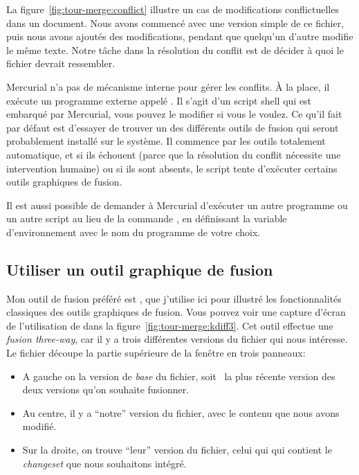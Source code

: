 La figure~\ref{fig:tour-merge:conflict} illustre un cas de modifications
conflictuelles dans un document. Nous avons commencé avec une version simple
de ce fichier, puis nous avons ajoutés des modifications, pendant que 
quelqu'un d'autre modifie le même texte. Notre tâche dans la résolution
du conflit est de décider à quoi le fichier devrait ressembler.

Mercurial n'a pas de mécanisme interne pour gérer les conflits. 
À la place, il exécute un programme externe appelé .
Il s'agit d'un script shell qui est embarqué par Mercurial, vous
pouvez le modifier si vous le voulez. Ce qu'il fait par défaut est
d'essayer de trouver un des différents outils de fusion qui seront
probablement installé sur le système. Il commence par les outils
totalement automatique, et si ils échouent (parce que la résolution
du conflit nécessite une intervention humaine) ou si ils sont absents,
le script tente d'exécuter certains outils graphiques de fusion.

Il est aussi possible de demander à Mercurial d'exécuter un autre
programme ou un autre script au lieu de la commande ,
en définissant la variable d'environnement  avec le nom
du programme de votre choix.

\subsection{Utiliser un outil graphique de fusion}

Mon outil de fusion préféré est , que j'utilise ici
pour illustré les fonctionnalités classiques des outils graphiques 
de fusion. Vous pouvez voir une capture d'écran de l'utilisation de 
 dans la figure~\ref{fig:tour-merge:kdiff3}. Cet outil
effectue une \emph{fusion \textit{three-way}}, car il y a trois différentes
versions du fichier qui nous intéresse. Le fichier découpe la partie
supérieure de la fenêtre en trois panneaux:

\begin{itemize}
\item A gauche on la version de \emph{base} du fichier, soit ~la plus 
  récente version des deux versions qu'on souhaite fusionner.
\item Au centre, il y a ``notre'' version du fichier, avec le contenu 
  que nous avons modifié.
\item Sur la droite, on trouve ``leur'' version du fichier, celui qui qui
  contient le \textit{changeset} que nous souhaitons intégré. 
\end{itemize}

